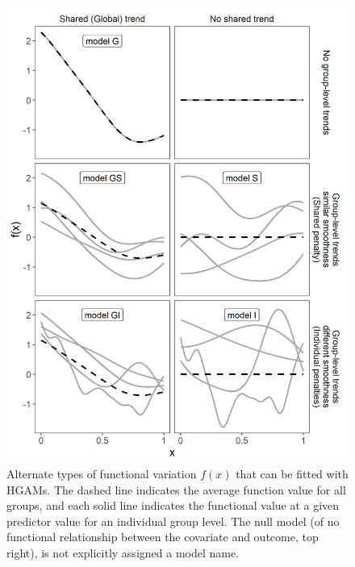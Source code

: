 \documentclass[12pt]{article}
\begin{document}
\begin{figure}
\centering
\includegraphics{../figures/alternate_models.png}
\caption{\label{fig:models}Alternate types of functional variation
\(f(x)\) that can be fitted with HGAMs. The dashed line indicates the
average function value for all groups, and each solid line indicates the
functional value at a given predictor value for an individual group
level. The null model (of no functional relationship between the
covariate and outcome, top right), is not explicitly assigned a model
name.}
\end{figure}
\end{document}
